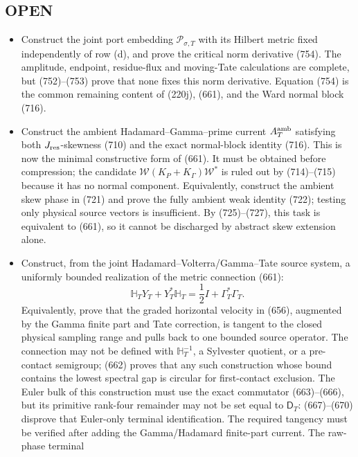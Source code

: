 \documentclass[11pt]{article}
\begin{document}
\subsection*{OPEN}
\begin{itemize}
\item Construct the joint port embedding
      \(\mathscr P_{\sigma,T}\) with its Hilbert metric fixed independently
      of row (d), and prove the critical norm derivative (754).  The
      amplitude, endpoint, residue-flux and moving-Tate calculations are
      complete, but (752)--(753) prove that none fixes this norm derivative.
      Equation (754) is the common remaining content of (220j), (661), and
      the Ward normal block (716).
\item Construct the ambient Hadamard--Gamma--prime current
      \(A_T^{\rm amb}\) satisfying both \(J_{\rm res}\)-skewness (710) and
      the exact normal-block identity (716).  This is now the minimal
      constructive form of (661).  It must be obtained before compression;
      the candidate \(\mathcal W(K_P+K_\Gamma)\mathcal W^*\) is ruled out by
      (714)--(715) because it has no normal component.  Equivalently,
      construct the ambient skew phase in (721) and prove the fully
      ambient weak identity (722); testing only physical source vectors is
      insufficient.  By (725)--(727), this task is equivalent to (661), so
      it cannot be discharged by abstract skew extension alone.
\item Construct, from the joint Hadamard--Volterra/Gamma--Tate source
      system, a uniformly bounded realization of the metric connection
      (661):
      \[
      \mathbb H_TY_T+Y_T^*\mathbb H_T
      =\frac12I+\Gamma_T^*\Gamma_T.
      \]
      Equivalently, prove that the graded horizontal velocity in (656),
      augmented by the Gamma finite part and Tate correction, is tangent to
      the closed physical sampling range and pulls back to one bounded source
      operator.  The connection may not be defined with
      \(\mathbb H_T^{-1}\), a Sylvester quotient, or a pre-contact semigroup;
      (662) proves that any such construction whose bound contains the
lowest spectral gap is circular for first-contact exclusion.  The
Euler bulk of this construction must use the exact commutator
      (663)--(666), but its primitive rank-four remainder may not be set equal
      to \(\mathsf D_T\): (667)--(670) disprove that Euler-only terminal
      identification.  The required tangency must be verified after adding
      the Gamma/Hadamard finite-part current.  The raw-phase terminal

\end{itemize}
\end{document}
